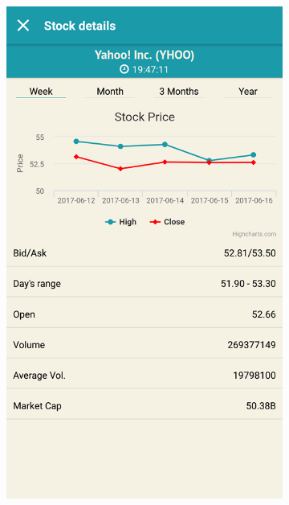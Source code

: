 \documentclass[a4paper,12pt,fleqn]{article}
\begin{document}
\begin{appendices}
\begin{figure}
\begin{subfigure}{0.5\textwidth}
		\includegraphics[width=0.8\linewidth]{stockDetails.png}
		\label{app:priedas8}
	\end{subfigure}%
\end{figure}

\end{appendices}
\end{document}
